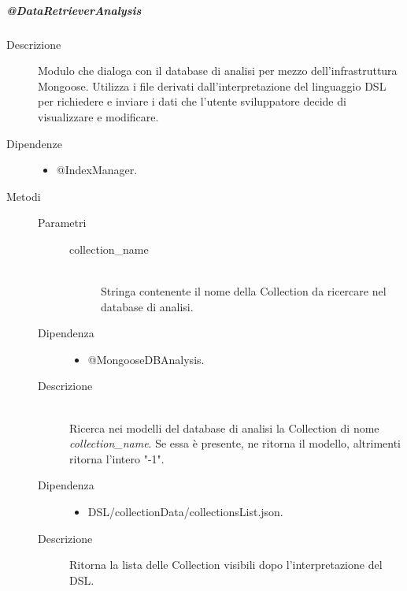 \subparagraph{@DataRetrieverAnalysis}
\begin{description}
\item[Descrizione] \hfill 
Modulo che dialoga con il database di analisi per mezzo dell'infrastruttura Mongoose. Utilizza i file derivati dall'interpretazione del 
linguaggio DSL per richiedere e inviare i dati che l'utente sviluppatore decide di visualizzare e modificare.
\item[Dipendenze] \hfill 
\begin{itemize}
\item @IndexManager.
\end{itemize}

\item[Metodi] \hfill 
\begin{mldescription}
	 \hfill 
		\begin{description}
			\item[Parametri] \hfill
				\begin{description}
					\item[collection\_name] \hfill \\
					Stringa contenente il nome della Collection da ricercare nel database di analisi.
				\end{description}
			\item[Dipendenza] \hfill 
				\begin{itemize}
					\item @MongooseDBAnalysis.
				\end{itemize}
			\item[Descrizione] \hfill \\
			Ricerca nei modelli del database di analisi la Collection di nome \textit{collection\_name}.
			Se essa è presente, ne ritorna il modello, altrimenti ritorna l'intero "-1".
		\end{description}

	 \hfill
	 
	 \hfill 
		\begin{description}
			\item[Dipendenza] \hfill
				\begin{itemize}
					\item DSL/collectionData/collectionsList.json.
				\end{itemize}
			\item[Descrizione] \hfill
			Ritorna la lista delle Collection visibili dopo l'interpretazione del DSL. 
		\end{description}
		

\end{mldescription}
\end{description}
